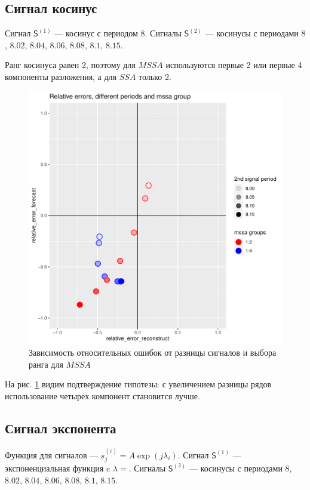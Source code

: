 \documentclass[specialist, substylefile = spbureport.rtx,
    subf,href,colorlinks=true, 12pt]{disser}
\newcommand{\sfS}{\mathsf{S}}
\begin{document}
    \subsection{Сигнал косинус}
        Сигнал $\sfS^{(1)}$ --- косинус с периодом $8$.
        Сигналы $\sfS^{(2)}$ --- косинусы с периодами $8$, $8.02$, $8.04$, $8.06$, $8.08$, $8.1$, $8.15$.

        Ранг косинуса равен 2, поэтому для $MSSA$ используются первые 2 или первые 4 компоненты разложения, а для $SSA$ только 2.

        \begin{figure}[h]
            \centering
            \includegraphics[width=\textwidth]{experiment_1_cos.pdf}
            \caption{Зависимость относительных ошибок от разницы сигналов и выбора ранга для $MSSA$}
            \label{fig:exp1_cos}
        \end{figure}

        На рис. \ref{fig:exp1_cos} видим подтверждение гипотезы: с увеличением разницы рядов использование четырех компонент становится лучше.

    \subsection{Сигнал экспонента}
        Функция для сигналов --- $s^{(i)}_j = A \exp(j\lambda_i)$.
        Сигнал $\sfS^{(1)}$ --- экспоненциальная функция c $\lambda = $.
        Сигналы $\sfS^{(2)}$ --- косинусы с периодами $8$, $8.02$, $8.04$, $8.06$, $8.08$, $8.1$, $8.15$.
\end{document}
